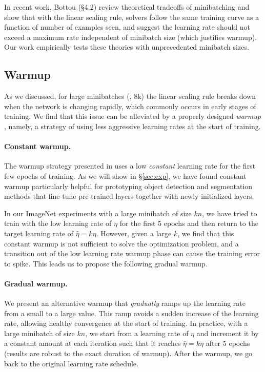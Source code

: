 \documentclass[10pt,twocolumn,letterpaper]{article}
\begin{document}
In recent work, Bottou \etal \cite{Bottou2016} (\S4.2) review theoretical tradeoffs of minibatching and show that with the linear scaling rule, solvers follow the same training curve as a function of number of examples seen, and suggest the learning rate should not exceed a maximum rate independent of minibatch size (which justifies warmup). Our work empirically tests these theories with unprecedented minibatch sizes.

\subsection{Warmup}\label{sec:warmup}

As we discussed, for large minibatches (\eg, 8k) the linear scaling rule breaks down when the network is changing rapidly, which commonly occurs in early stages of training. We find that this issue can be alleviated by a properly designed \emph{warmup} \cite{He2016}, namely, a strategy of using less aggressive learning rates at the start of training.

\paragraph{Constant warmup.} The warmup strategy presented in \cite{He2016} uses a low \emph{constant} learning rate for the first few epochs of training. As we will show in \S\ref{sec:exp}, we have found constant warmup particularly helpful for prototyping object detection and segmentation methods \cite{Girshick2015, Ren2015, Lin2017, He2017} that fine-tune pre-trained layers together with newly initialized layers.

In our ImageNet experiments with a large minibatch of size $kn$, we have tried to train with the low learning rate of $\eta$ for the first 5 epochs and then return to the target learning rate of $\hat\eta=k\eta$. However, given a large $k$, we find that this constant warmup is not sufficient to solve the optimization problem, and a transition out of the low learning rate warmup phase can cause the training error to spike. This leads us to propose the following gradual warmup.

\paragraph{Gradual warmup.} We present an alternative warmup that \emph{gradually} ramps up the learning rate from a small to a large value. This ramp avoids a sudden increase of the learning rate, allowing healthy convergence at the start of training. In practice, with a large minibatch of size $kn$, we start from a learning rate of $\eta$ and increment it by a constant amount at each iteration such that it reaches $\hat\eta=k\eta$ after 5 epochs (results are robust to the exact duration of warmup). After the warmup, we go back to the original learning rate schedule.
\end{document}
